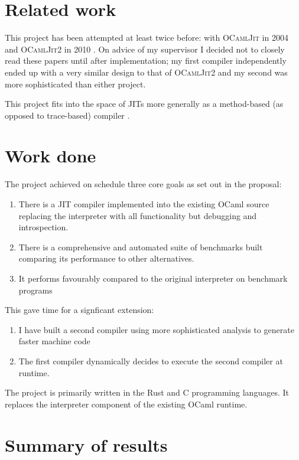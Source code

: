 \section{Related work}

This project has been attempted at least twice before: with \textsc{OCamlJit} in 2004 \cite{ocjit1}
and \textsc{OCamlJit2} in 2010 \cite{ocjit2}. On advice of my supervisor I decided not to closely
read these papers until after implementation; my first compiler independently ended up with a very
similar design to that of \textsc{OCamlJit2} and my second was more sophisticated than either
project.

This project fits into the space of JITs more generally as a method-based (as opposed to
trace-based) compiler \cite{pyket}.
\section{Work done}

The project achieved on schedule three core goals as set out in the proposal:

\begin{enumerate}
      \item There is a JIT compiler implemented into the existing OCaml source
            replacing the interpreter with all functionality but debugging
            and introspection.
      \item There is a comprehensive and automated suite of benchmarks built
            comparing its performance to other alternatives.
      \item It performs favourably compared to the original interpreter on benchmark programs
\end{enumerate}

This gave time for a signficant extension:

\begin{enumerate}
      \item I have built a second compiler using more sophisticated analysis to generate faster
            machine code
      \item The first compiler dynamically decides to execute the second compiler at runtime.
\end{enumerate}

The project is primarily written in the Rust and C programming languages. It replaces the
interpreter component of the existing OCaml runtime.

\section{Summary of results}

